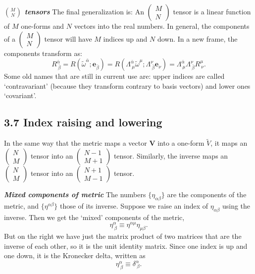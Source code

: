 \documentclass[12pt]{book}
\begin{document}
    \textit{\textbf{\(\binom{M}{N}\) tensors}}
    The final generalization is:
    An \(\left(\begin{array}{c} M \\ N \end{array}\right)\) tensor is a linear function of \(M\) one-forms and \(N\) vectors into the real numbers.
    In general, the components of a \(\left(\begin{array}{c} M \\ N \end{array}\right)\) tensor will have \(M\) indices up and \(N\) down. In a new frame, the components transform as:
    \[
    R^{\bar{\alpha}}_{\ \bar{\beta}} = R(\tilde{\omega}^{\bar{\alpha}}; \mathbf{e}_{\bar{\beta}})
    = R\left(\Lambda^{\bar{\alpha}}_{\ \mu} \tilde{\omega}^{\mu}; \Lambda^{\nu}_{\ \bar{\beta}} \mathbf{e}_{\nu}\right)
    = \Lambda^{\bar{\alpha}}_{\ \mu} \Lambda^{\nu}_{\ \bar{\beta}} R^{\mu}_{\ \nu}. \tag{3.55}
    \]
    Some old names that are still in current use are: upper indices are called ‘contravariant’ (because they transform contrary to basis vectors) and lower ones ‘covariant’.

    \subsection{3.7 Index raising and lowering}
    In the same way that the metric maps a vector \(\mathbf{V}\) into a one-form \(\tilde{V}\), it maps an \(\left(\begin{array}{c} N \\ M \end{array}\right)\) tensor into an \(\left(\begin{array}{c} N-1 \\ M+1 \end{array}\right)\) tensor. Similarly, the inverse maps an \(\left(\begin{array}{c} N \\ M \end{array}\right)\) tensor into an \(\left(\begin{array}{c} N+1 \\ M-1 \end{array}\right)\) tensor.

    \textit{\textbf{Mixed components of metric}}
    The numbers \(\{\eta_{\alpha\beta}\}\) are the components of the metric, and \(\{\eta^{\alpha\beta}\}\) those of its inverse. Suppose we raise an index of \(\eta_{\alpha\beta}\) using the inverse. Then we get the ‘mixed’ components of the metric,
    \[
    \eta^\alpha_{\ \beta} \equiv \eta^{\alpha\mu} \eta_{\mu\beta}. \tag{3.59}
    \]
    But on the right we have just the matrix product of two matrices that are the inverse of each other, so it is the unit identity matrix. Since one index is up and one down, it is the Kronecker delta, written as
    \[
    \eta^\alpha_{\ \beta} \equiv \delta^\alpha_{\ \beta}. \tag{3.60}
    \]
\end{document}
